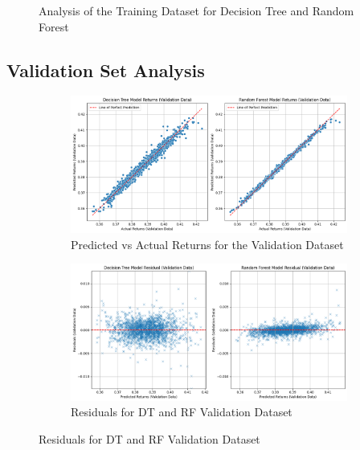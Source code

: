 \documentclass[a4paper,12pt,titlepage]{article}
\numberwithin{equation}{section}
\begin{document}
\begin{figure}[!htbp]
	\caption{Analysis of the Training Dataset for Decision Tree and Random Forest}
	\label{fig:combinedfigure1}

\end{figure}

\subsection{Validation Set Analysis}

\begin{figure}[!htbp]
	\centering

	\begin{subfigure}[!b]{0.8\linewidth}
		\includegraphics[width=\linewidth,keepaspectratio]{Plots/ValidationPvA.png}
		\caption{Predicted vs Actual Returns for the Validation Dataset}
		\label{fig:figure9}
	\end{subfigure}
	
	\vspace{0.2cm} 
	
	\begin{subfigure}[!b]{0.8\linewidth}
		\includegraphics[width=\linewidth,keepaspectratio]{Plots/ValidationResidual.png}
		\caption{Residuals for DT and RF Validation Dataset}
		\label{fig:figure10}
	\end{subfigure}
	

\end{figure}
\end{document}
